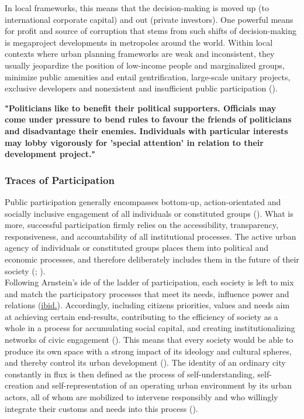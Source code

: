 \documentclass[11pt]{report}
\begin{document}
{{{In local frameworks, this means that the decision-making is moved up (to international corporate capital) and out (private investors).
One powerful means for profit and source of corruption that stems from such shifts of decision-making is megaproject developments in metropoles around the world.
Within local contexts where urban planning frameworks are weak and inconsistent, they usually jeopardize the position of low-income people and marginalized groups, minimize public amenities and entail gentrification, large-scale unitary projects, exclusive developers and nonexistent and insufficient public participation (\href{Fainstein}{\citealt{fainstein_just_2010}}).

\textbf{"Politicians like to benefit their political supporters. Officials may come under pressure to bend rules to favour the friends of politicians and disadvantage their enemies. Individuals with particular interests may lobby vigorously for 'special attention' in relation to their development project." \href{Healey}{\cite{healey_collaborative_1997}}}

\subsubsection{Traces of Participation}

Public participation generally encompasses bottom-up, action-orientated and socially inclusive engagement of all individuals or constituted groups
(\href{UN}{\citealt{UN_building_2009}}). %
What is more, successful participation firmly relies on the accessibility, transparency, responsiveness, and accountability of all institutional processes. The active urban agency of individuals or constituted groups places them into political and economic processes, and therefore deliberately includes them in the future of their society
(\href{Arnstein}{\citealt{arnstein_ladder_1969}};
\href{Fisher}{\citealt{fisher_building_2001}}).
\\

Following Arnstein's ide of the ladder of participation, each society is left to mix and match the participatory processes that meet its needs, influence power and relations (\href{Fisher}{ibid.}).
Accordingly, including citizens priorities, values and needs aim at achieving certain end-results, contributing to the efficiency of society as a whole in a process for accumulating social capital, and creating institutionalizing networks of civic engagement (\href{Putnam}{\citealt{putnam_making_1993}}).
This means that every society would be able to produce its own space with a strong impact of its ideology and cultural spheres, and thereby control its urban development (\href{Lefebvre}{\citealt{lefebvre_production_1974}}). 
The identity of an ordinary city constantly in flux is then defined as the process of self-understanding, self-creation and self-representation of an operating urban environment by its urban actors, all of whom are mobilized to intervene responsibly and who willingly integrate their customs and needs into this process
(\href{Bolay}{\citealt{bolay_urban_2004}}).
\\

}}}
\end{document}
